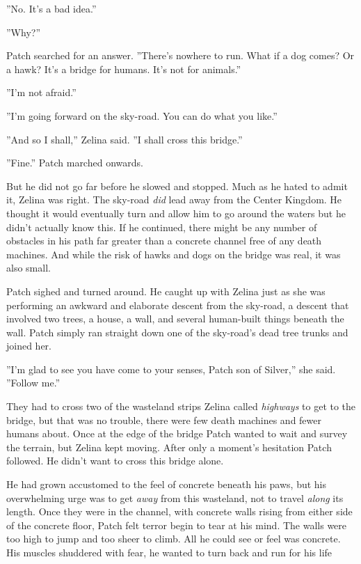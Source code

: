 \documentclass[12pt]{book}
\begin{document}
 ''No. It's a bad idea.''\par
 ''Why?''\par
 Patch searched for an answer. ''There's nowhere to run. What if a dog comes? Or a hawk? It's a bridge for humans. It's not for animals.''\par
 ''I'm not afraid.''\par
 ''I'm going forward on the sky-road. You can do what you like.''\par
 ''And so I shall,'' Zelina said. ''I shall cross this bridge.''\par
 ''Fine.'' Patch marched onwards.\par
 But he did not go far before he slowed and stopped. Much as he hated to admit it, Zelina was right. The sky-road {\it did} lead away from the Center Kingdom. He thought it would eventually turn and allow him to go around the waters %
 but he didn't actually know this. If he continued, there might be any number of obstacles in his path far greater than a concrete channel free of any death machines. And while the risk of hawks and dogs on the bridge was real, it was also small.\par
 Patch sighed and turned around. He caught up with Zelina just as she was performing an awkward and elaborate descent from the sky-road, a descent that involved two trees, a house, a wall, and several human-built things beneath the wall. Patch simply ran straight down one of the sky-road's dead tree trunks and joined her.\par
 ''I'm glad to see you have come to your senses, Patch son of Silver,'' she said. ''Follow me.''\par
 They had to cross two of the wasteland strips Zelina called {\it highways} to get to the bridge, but that was no trouble, there were few death machines and fewer humans about. Once at the edge of the bridge Patch wanted to wait and survey the terrain, but Zelina kept moving. After only a moment's hesitation Patch followed. He didn't want to cross this bridge alone.\par
 He had grown accustomed to the feel of concrete beneath his paws, but his overwhelming urge was to get {\it away} from this wasteland, not to travel {\it along} its length. Once they were in the channel, with concrete walls rising from either side of the concrete floor, Patch felt terror begin to tear at his mind. The walls were too high to jump and too sheer to climb. All he could see or feel was concrete. His muscles shuddered with fear, he wanted to turn back and run for his life %
\end{document}
